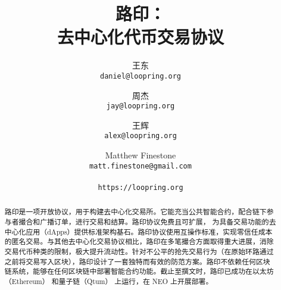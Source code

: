 \documentclass[UTF8,nofonts]{ctexart}%
\title{\textbf{路印：}\\\textbf{去中心化代币交易协议}}
\author{
  王东\\
  \texttt{daniel@loopring.org}\\
  \and
  	周杰\\
  	\texttt{jay@loopring.org}\\
  	\and
  	王辉\\
  	\texttt{alex@loopring.org}\\
  	\and
  	Matthew Finestone\\
  	\texttt{matt.finestone@gmail.com}\\ 
  \\
  \texttt{https://loopring.org}
 }
\begin{document}
\maketitle


\begin{abstract}
路印是一项开放协议，用于构建去中心化交易所。它能充当公共智能合约，配合链下参与者撮合和广播订单，进行交易和结算。路印协议免费且可扩展， 为具备交易功能的去中心化应用（dApps）提供标准架构基石。路印协议使用互操作标准，实现零信任成本的匿名交易。与其他去中心化交易协议相比，路印在多笔撮合方面取得重大进展，消除交易代币种类的限制，极大提升流动性。针对不公平的抢先交易行为（在原始环路通过之前将交易写入区块），路印设计了一套独特而有效的防范方案。路印不依赖任何区块链系统，能够在任何区块链中部署智能合约功能。截止至撰文时，路印已成功在以太坊（Ethereum）\cite{buterin2017ethereum} \cite{wood2014ethereum} 和量子链（Qtum）\cite{dai2017smart} 上运行，在 NEO \cite{atterlonn2018distributed} 上开展部署。

\end{abstract}
\end{document}

